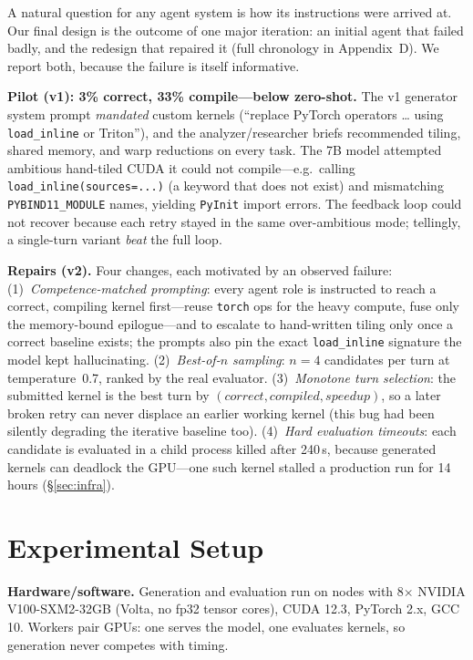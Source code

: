 \documentclass[conference]{IEEEtran}
\begin{document}
A natural question for any agent system is how its instructions were arrived at.
Our final design is the outcome of one major iteration: an initial agent that
failed badly, and the redesign that repaired it (full chronology in Appendix~D).
We report both, because the failure is itself informative.

\textbf{Pilot (v1): 3\% correct, 33\% compile---below zero-shot.} The v1 generator
system prompt \emph{mandated} custom kernels (``replace PyTorch operators \dots
using \texttt{load\_inline} or Triton''), and the analyzer/researcher briefs
recommended tiling, shared memory, and warp reductions on every task. The 7B model
attempted ambitious hand-tiled CUDA it could not compile---e.g.\ calling
\texttt{load\_inline(sources=...)} (a keyword that does not exist) and mismatching
\texttt{PYBIND11\_MODULE} names, yielding \texttt{PyInit} import errors. The
feedback loop could not recover because each retry stayed in the same
over-ambitious mode; tellingly, a single-turn variant \emph{beat} the full loop.

\textbf{Repairs (v2).} Four changes, each motivated by an observed failure:
(1)~\emph{Competence-matched prompting}: every agent role is instructed to reach a
correct, compiling kernel first---reuse \texttt{torch} ops for the heavy compute,
fuse only the memory-bound epilogue---and to escalate to hand-written tiling only
once a correct baseline exists; the prompts also pin the exact
\texttt{load\_inline} signature the model kept hallucinating.
(2)~\emph{Best-of-$n$ sampling}: $n{=}4$ candidates per turn at temperature~0.7,
ranked by the real evaluator. (3)~\emph{Monotone turn selection}: the submitted
kernel is the best turn by $(\textit{correct},\textit{compiled},\textit{speedup})$,
so a later broken retry can never displace an earlier working kernel (this bug had
been silently degrading the iterative baseline too). (4)~\emph{Hard evaluation
timeouts}: each candidate is evaluated in a child process killed after 240\,s,
because generated kernels can deadlock the GPU---one such kernel stalled a
production run for 14 hours (\S\ref{sec:infra}).

\section{Experimental Setup}

\textbf{Hardware/software.} Generation and evaluation run on nodes with 8$\times$
NVIDIA V100-SXM2-32GB (Volta, no fp32 tensor cores), CUDA 12.3, PyTorch 2.x, GCC
10. Workers pair GPUs: one serves the model, one evaluates kernels, so generation
never competes with timing.
\end{document}
